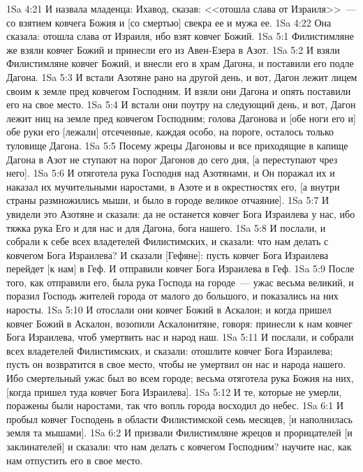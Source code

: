 \vs 1Sa 4:21 И назвала младенца: Ихавод, сказав: <<отошла слава от Израиля>>~--- со взятием ковчега Божия и [со смертью] свекра ее и мужа ее.
\vs 1Sa 4:22 Она сказала: отошла слава от Израиля, ибо взят ковчег Божий.
\vs 1Sa 5:1 Филистимляне же взяли ковчег Божий и принесли его из Авен-Езера в Азот.
\vs 1Sa 5:2 И взяли Филистимляне ковчег Божий, и внесли его в храм Дагона, и поставили его подле Дагона.
\vs 1Sa 5:3 И встали Азотяне рано на другой день, и вот, Дагон лежит лицем своим к земле пред ковчегом Господним. И взяли они Дагона и опять поставили его на свое место.
\vs 1Sa 5:4 И встали они поутру на следующий день, и вот, Дагон лежит ниц на земле пред ковчегом Господним; голова Дагонова и [обе ноги его и] обе руки его [лежали] отсеченные, каждая особо, на пороге, осталось только туловище Дагона.
\vs 1Sa 5:5 Посему жрецы Дагоновы и все приходящие в капище Дагона в Азот не ступают на порог Дагонов до сего дня, [а переступают чрез него].
\vs 1Sa 5:6 И отяготела рука Господня над Азотянами, и Он поражал их и наказал их мучительными наростами, в Азоте и в окрестностях его, [а внутри страны размножились мыши, и было в городе великое отчаяние].
\vs 1Sa 5:7 И увидели это Азотяне и сказали: да не останется ковчег Бога Израилева у нас, ибо тяжка рука Его и для нас и для Дагона, бога нашего.
\vs 1Sa 5:8 И послали, и собрали к себе всех владетелей Филистимских, и сказали: что нам делать с ковчегом Бога Израилева? И сказали [Гефяне]: пусть ковчег Бога Израилева перейдет [к нам] в Геф. И отправили ковчег Бога Израилева в Геф.
\vs 1Sa 5:9 После того, как отправили его, была рука Господа на городе~--- ужас весьма великий, и поразил Господь жителей города от малого до большого, и показались на них наросты.
\vs 1Sa 5:10 И отослали они ковчег Божий в Аскалон; и когда пришел ковчег Божий в Аскалон, возопили Аскалонитяне, говоря: принесли к нам ковчег Бога Израилева, чтоб умертвить нас и народ наш.
\vs 1Sa 5:11 И послали, и собрали всех владетелей Филистимских, и сказали: отошлите ковчег Бога Израилева; пусть он возвратится в свое место, чтобы не умертвил он нас и народа нашего. Ибо смертельный ужас был во всем городе; весьма отяготела рука Божия на них, [когда пришел туда ковчег Бога Израилева].
\vs 1Sa 5:12 И те, которые не умерли, поражены были наростами, так что вопль города восходил до небес.
\vs 1Sa 6:1 И пробыл ковчег Господень в области Филистимской семь месяцев, [и наполнилась земля та мышами].
\vs 1Sa 6:2 И призвали Филистимляне жрецов и прорицателей [и заклинателей] и сказали: что нам делать с ковчегом Господним? научите нас, как нам отпустить его в свое место.
